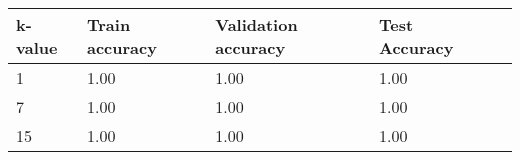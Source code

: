 \def\arraystretch{1.25}
\begin{center}
\begin{longtable}{l l l l l}
\hline
\hline
\textbf{k-value} & \textbf{Train accuracy} & \textbf{Validation accuracy} & \textbf{Test Accuracy}\\
\hline
\hline
1 & 1.00 & 1.00 & 1.00 \\
7 & 1.00 & 1.00 & 1.00 \\
15 & 1.00 & 1.00 & 1.00 \\

\hline
\end{longtable}
\setcounter{table}{0}
\end{center}